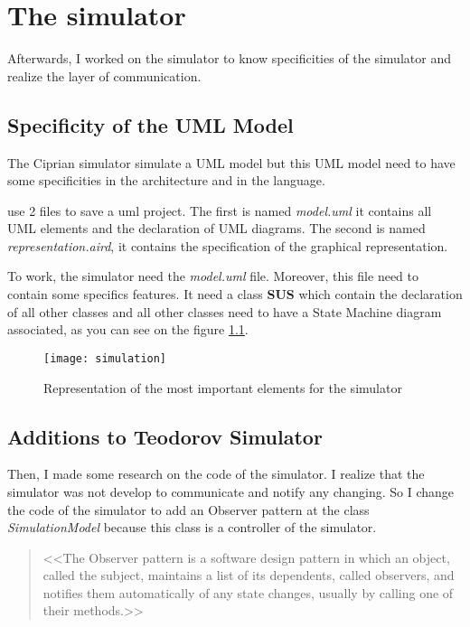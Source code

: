 
\chapter{The simulator}
\label{chap:simul}

Afterwards, I worked on the simulator to know specificities of the simulator and realize the layer of communication.

\section{Specificity of the UML Model}

The Ciprian simulator simulate a UML model but this UML model need to have some specificities in the architecture and in the language.

\umld use 2 files to save a uml project. The first is named \textit{model.uml} it contains all UML elements and the declaration of UML diagrams. The second is named \textit{representation.aird}, it contains the specification of the graphical representation.

To work, the simulator need the \textit{model.uml} file. Moreover, this file need to contain some specifics features. It need a class \textbf{SUS} which contain the declaration of all other classes and all other classes need to have a State Machine diagram associated, as you can see on the figure \ref{fig:simulateur}.

\begin{figure}[h!]
  \centering
  \texttt{[image: simulation]}
  \caption{Representation of the most important elements for the simulator}
  \label{fig:simulateur}
\end{figure}

\section{Additions to Teodorov Simulator}

Then, I made some research on the code of the simulator. I realize that the simulator was not develop to communicate and notify any changing. So I change the code of the simulator to add an Observer pattern at the class \textit{SimulationModel} because this class is a controller of the simulator.

\begin{quotation}
<<The Observer pattern is a software design pattern in which an object, called the subject, maintains a list of its dependents, called observers, and notifies them automatically of any state changes, usually by calling one of their methods.>> \cite{wiki_pattern}
\end{quotation}


